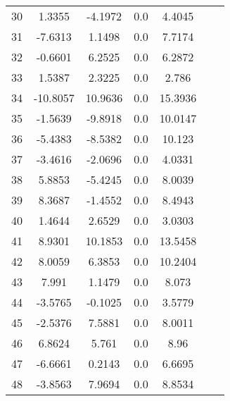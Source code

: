 \documentclass[journal=jacsat,manuscript=article]{achemso}
\begin{document}
\begin{table}
\begin{tabular}{ccccccc}
30 & 1.3355 & -4.1972 & 0.0 & 4.4045 \\ 
31 & -7.6313 & 1.1498 & 0.0 & 7.7174 \\ 
32 & -0.6601 & 6.2525 & 0.0 & 6.2872 \\ 
33 & 1.5387 & 2.3225 & 0.0 & 2.786 \\ 
34 & -10.8057 & 10.9636 & 0.0 & 15.3936 \\ 
35 & -1.5639 & -9.8918 & 0.0 & 10.0147 \\ 
36 & -5.4383 & -8.5382 & 0.0 & 10.123 \\ 
37 & -3.4616 & -2.0696 & 0.0 & 4.0331 \\ 
38 & 5.8853 & -5.4245 & 0.0 & 8.0039 \\ 
39 & 8.3687 & -1.4552 & 0.0 & 8.4943 \\ 
40 & 1.4644 & 2.6529 & 0.0 & 3.0303 \\ 
41 & 8.9301 & 10.1853 & 0.0 & 13.5458 \\ 
42 & 8.0059 & 6.3853 & 0.0 & 10.2404 \\ 
43 & 7.991 & 1.1479 & 0.0 & 8.073 \\ 
44 & -3.5765 & -0.1025 & 0.0 & 3.5779 \\ 
45 & -2.5376 & 7.5881 & 0.0 & 8.0011 \\ 
46 & 6.8624 & 5.761 & 0.0 & 8.96 \\ 
47 & -6.6661 & 0.2143 & 0.0 & 6.6695 \\ 
48 & -3.8563 & 7.9694 & 0.0 & 8.8534 \\ 
\hline 

  \end{tabular}
\end{table}
\end{document}
